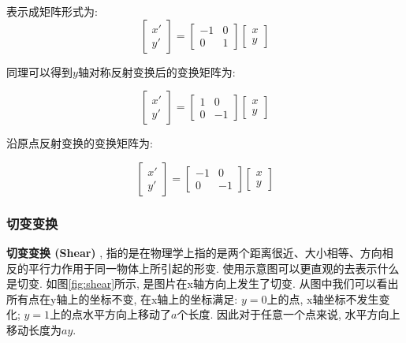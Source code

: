 表示成矩阵形式为: 
\begin{equation}
	\begin{bmatrix}
	x' \\
	y'
\end{bmatrix} = \begin{bmatrix}
-1&0\\0&1\end{bmatrix}\begin{bmatrix}x\\y\end{bmatrix}
\end{equation}

同理可以得到$y$轴对称反射变换后的变换矩阵为: 

\begin{equation}
	\begin{bmatrix}
		x' \\
		y'
	\end{bmatrix} = \begin{bmatrix}
		1&0\\0&-1\end{bmatrix}\begin{bmatrix}x\\y\end{bmatrix}
\end{equation}

沿原点反射变换的变换矩阵为: 

\begin{equation}
	\begin{bmatrix}
		x' \\
		y'
	\end{bmatrix} = \begin{bmatrix}
		-1&0\\0&-1\end{bmatrix}\begin{bmatrix}x\\y\end{bmatrix}
\end{equation}

\subsubsection{切变变换}

\textbf{切变变换 (Shear) }, 指的是在物理学上指的是两个距离很近、大小相等、方向相反的平行力作用于同一物体上所引起的形变. 使用示意图可以更直观的去表示什么是切变. 如图\ref{fig:shear}所示, 是图片在x轴方向上发生了切变. 从图中我们可以看出所有点在y轴上的坐标不变, 在x轴上的坐标满足: $y=0$上的点, x轴坐标不发生变化; $y=1$上的点水平方向上移动了$a$个长度. 因此对于任意一个点来说, 水平方向上移动长度为$ay$. 


